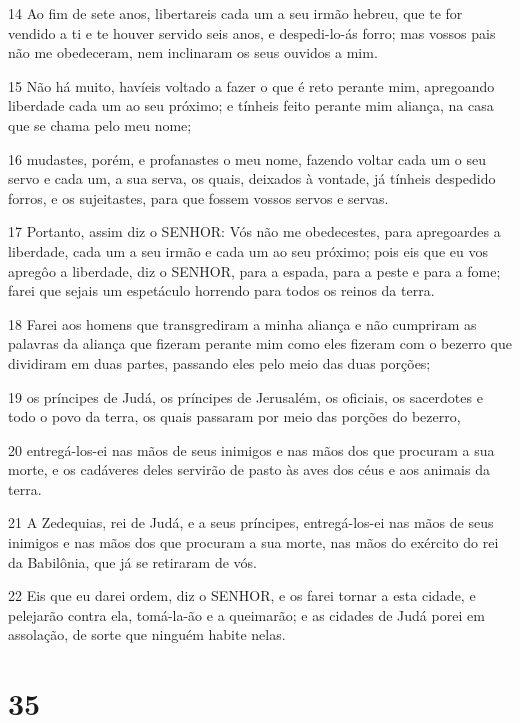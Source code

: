 \par 14 Ao fim de sete anos, libertareis cada um a seu irmão hebreu, que te for vendido a ti e te houver servido seis anos, e despedi-lo-ás forro; mas vossos pais não me obedeceram, nem inclinaram os seus ouvidos a mim.
\par 15 Não há muito, havíeis voltado a fazer o que é reto perante mim, apregoando liberdade cada um ao seu próximo; e tínheis feito perante mim aliança, na casa que se chama pelo meu nome;
\par 16 mudastes, porém, e profanastes o meu nome, fazendo voltar cada um o seu servo e cada um, a sua serva, os quais, deixados à vontade, já tínheis despedido forros, e os sujeitastes, para que fossem vossos servos e servas.
\par 17 Portanto, assim diz o SENHOR: Vós não me obedecestes, para apregoardes a liberdade, cada um a seu irmão e cada um ao seu próximo; pois eis que eu vos apregôo a liberdade, diz o SENHOR, para a espada, para a peste e para a fome; farei que sejais um espetáculo horrendo para todos os reinos da terra.
\par 18 Farei aos homens que transgrediram a minha aliança e não cumpriram as palavras da aliança que fizeram perante mim como eles fizeram com o bezerro que dividiram em duas partes, passando eles pelo meio das duas porções;
\par 19 os príncipes de Judá, os príncipes de Jerusalém, os oficiais, os sacerdotes e todo o povo da terra, os quais passaram por meio das porções do bezerro,
\par 20 entregá-los-ei nas mãos de seus inimigos e nas mãos dos que procuram a sua morte, e os cadáveres deles servirão de pasto às aves dos céus e aos animais da terra.
\par 21 A Zedequias, rei de Judá, e a seus príncipes, entregá-los-ei nas mãos de seus inimigos e nas mãos dos que procuram a sua morte, nas mãos do exército do rei da Babilônia, que já se retiraram de vós.
\par 22 Eis que eu darei ordem, diz o SENHOR, e os farei tornar a esta cidade, e pelejarão contra ela, tomá-la-ão e a queimarão; e as cidades de Judá porei em assolação, de sorte que ninguém habite nelas.

\chapter{35}

